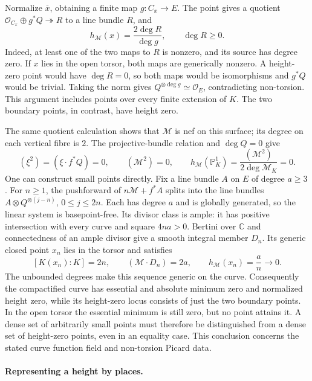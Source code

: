 Normalize $\overline x$, obtaining a finite map $g\colon C_x\to E$.
The point gives a quotient $\mathcal O_{C_x}\oplus g^*Q\twoheadrightarrow R$
to a line bundle $R$, and
\[
  h_{\mathcal M}(x)=\frac{2\deg R}{\deg g},
  \qquad \deg R\geq0.
\]
Indeed, at least one of the two maps to $R$ is nonzero, and its source
has degree zero.  If $x$ lies in the open torsor, both maps are generically
nonzero.  A height-zero point would have $\deg R=0$, so both maps would
be isomorphisms and $g^*Q$ would be trivial.  Taking the norm gives
$Q^{\otimes\deg g}\simeq\mathcal O_E$, contradicting non-torsion.
This argument includes points over every finite extension of $K$.
The two boundary points, in contrast, have height zero.

The same quotient calculation shows that $\mathcal M$ is nef on this
surface; its degree on each vertical fibre is $2$.  The projective-bundle
relation and $\deg Q=0$ give
\[
  (\xi^2)=(\xi\cdot f^*Q)=0,
  \qquad (\mathcal M^2)=0,
  \qquad h_{\mathcal M}(\mathbb P^1_K)
       =\frac{(\mathcal M^2)}{2\deg\mathcal M_K}=0.
\]
One can construct small points directly.  Fix a line bundle $A$ on $E$
of degree $a\geq3$.  For $n\geq1$, the pushforward of
$n\mathcal M+f^*A$ splits into the line bundles
$A\otimes Q^{\otimes(j-n)}$, $0\leq j\leq2n$.
Each has degree $a$ and is globally generated, so the linear system is
basepoint-free.  Its divisor class is ample: it has positive intersection
with every curve and square $4na>0$.  Bertini over $\mathbb C$ and
connectedness of an ample divisor give a smooth integral member $D_n$.
Its generic closed point $x_n$ lies in the torsor and satisfies
\[
  [K(x_n):K]=2n,
  \qquad (\mathcal M\cdot D_n)=2a,
  \qquad h_{\mathcal M}(x_n)=\frac an\longrightarrow0.
\]
The unbounded degrees make this sequence generic on the curve.
Consequently the compactified curve has essential and absolute minimum
zero and normalized height zero, while its height-zero locus consists
of just the two boundary points.  In the open torsor the essential
minimum is still zero, but no point attains it.  A dense set of arbitrarily
small points must therefore be distinguished from a dense set of
height-zero points, even in an equality case.  This conclusion concerns
the stated curve function field and non-torsion Picard data.

\paragraph{Representing a height by places.}

